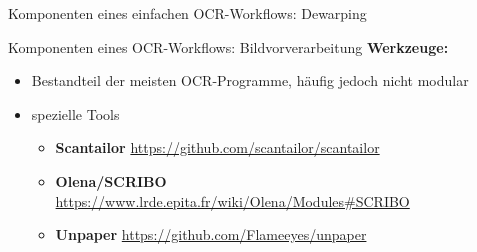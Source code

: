 \documentclass{bbawslides}
\begin{document}
\begin{bbawslide}{Komponenten eines einfachen OCR-Workflows: Dewarping}
  \vspace*{2mm}%
  \begin{center}
  \end{center}
\end{bbawslide}

\begin{bbawslide}{Komponenten eines OCR-Workflows: Bildvorverarbeitung}
  \vspace*{7mm}%
  \centerslidestrue%
  \textbf{Werkzeuge:}
  \begin{itemize}
    \item Bestandteil der meisten OCR-Programme, häufig jedoch nicht modular
    \item spezielle Tools
    \begin{itemize}\small
      \item \textbf{Scantailor} \url{https://github.com/scantailor/scantailor}
      \item \textbf{Olena/SCRIBO} \url{https://www.lrde.epita.fr/wiki/Olena/Modules#SCRIBO}
      \item \textbf{Unpaper} \url{https://github.com/Flameeyes/unpaper}
    \end{itemize}
  \end{itemize}
\end{bbawslide}
\end{document}
